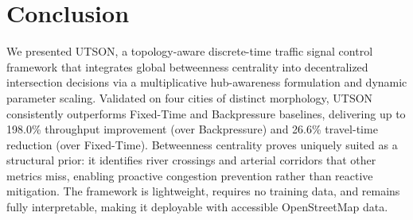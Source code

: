 \documentclass[letterpaper, conference]{IEEEtran}
\begin{document}
\section{Conclusion}
\label{section_conclusion}
\balance
We presented UTSON, a topology-aware discrete-time traffic signal control framework that integrates global betweenness centrality into decentralized intersection decisions via a multiplicative hub-awareness formulation and dynamic parameter scaling. Validated on four cities of distinct morphology, UTSON consistently outperforms Fixed-Time and Backpressure baselines, delivering up to 198.0\% throughput improvement (over Backpressure) and 26.6\% travel-time reduction (over Fixed-Time). Betweenness centrality proves uniquely suited as a structural prior: it identifies river crossings and arterial corridors that other metrics miss, enabling proactive congestion prevention rather than reactive mitigation. The framework is lightweight, requires no training data, and remains fully interpretable, making it deployable with accessible OpenStreetMap data.



\end{document}
